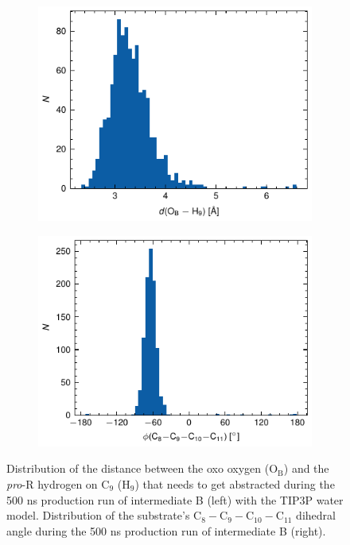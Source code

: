 \begin{figure}[htbp]
    \centering
    \begin{subfigure}{.49\textwidth}
        \centering
        \includegraphics{Figures/TIP3P_Ob-H9_hist.pdf}
    \end{subfigure}
    \begin{subfigure}{.49\textwidth}
        \centering
        \includegraphics{Figures/TIP3P_C9-C10_hist.pdf}
    \end{subfigure}
    \caption{Distribution of the distance between the oxo oxygen (O$_{\text{B}}$) and the \textit{pro}-R hydrogen on C$_{9}$ (H$_{9}$) that needs to get abstracted during the 500 ns production run of intermediate B (left) with the TIP3P water model. Distribution of the substrate's C$_8-$C$_9-$C$_{10}-$C$_{11}$ dihedral angle during the 500 ns production run of intermediate B (right).}
    \label{fig:TIP3P_production}
\end{figure}

